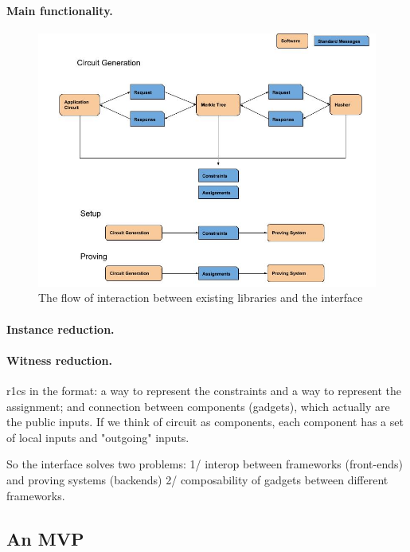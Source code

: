 \documentclass[a4paper,11pt]{article}
\begin{document}
	\paragraph{Main functionality.}
	
	
	
		\begin{figure}[h!]
			\includegraphics[width=\linewidth]{flow.jpg}
			\caption{The flow of interaction between existing libraries and the interface}
			\label{flow}
		\end{figure}
	
	\paragraph{Instance reduction.} 
	
	
	\paragraph{Witness reduction.}
	
	r1cs in the format: a way to represent the constraints and a way to represent the assignment; and connection between components (gadgets), which actually are the public inputs. If we think of circuit as components, each component has a set of local inputs and "outgoing" inputs.
	
	So the interface solves two problems: 1/ interop between frameworks (front-ends) and proving systems (backends) 2/ composability of gadgets between different frameworks.
	

	
	\subsection{An MVP}
	
\end{document}
